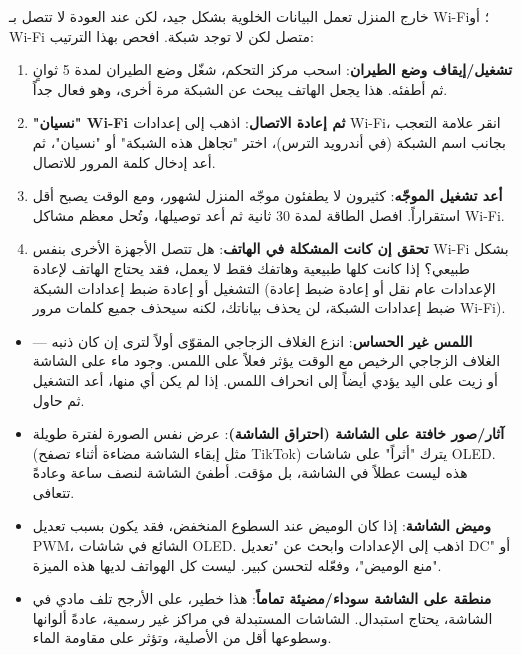 
خارج المنزل تعمل البيانات الخلوية بشكل جيد، لكن عند العودة لا تتصل بـ Wi-Fi؛ أو Wi-Fi متصل لكن لا توجد شبكة. افحص بهذا الترتيب:

\begin{enumerate}
  \item \textbf{تشغيل/إيقاف وضع الطيران}: اسحب مركز التحكم، شغّل وضع الطيران لمدة 5 ثوانٍ ثم أطفئه. هذا يجعل الهاتف يبحث عن الشبكة مرة أخرى، وهو فعال جداً.
  \item \textbf{"نسيان" Wi-Fi ثم إعادة الاتصال}: اذهب إلى إعدادات Wi-Fi، انقر علامة التعجب بجانب اسم الشبكة (في أندرويد الترس)، اختر "تجاهل هذه الشبكة" أو "نسيان"، ثم أعد إدخال كلمة المرور للاتصال.
  \item \textbf{أعد تشغيل الموجّه}: كثيرون لا يطفئون موجّه المنزل لشهور، ومع الوقت يصبح أقل استقراراً. افصل الطاقة لمدة 30 ثانية ثم أعد توصيلها، وتُحل معظم مشاكل Wi-Fi.
  \item \textbf{تحقق إن كانت المشكلة في الهاتف}: هل تتصل الأجهزة الأخرى بنفس Wi-Fi بشكل طبيعي؟ إذا كانت كلها طبيعية وهاتفك فقط لا يعمل، فقد يحتاج الهاتف لإعادة التشغيل أو إعادة ضبط إعدادات الشبكة (الإعدادات عام نقل أو إعادة ضبط إعادة ضبط إعدادات الشبكة، لن يحذف بياناتك، لكنه سيحذف جميع كلمات مرور Wi-Fi).
\end{enumerate}


\begin{itemize}
  \item \textbf{اللمس غير الحساس}: انزع الغلاف الزجاجي المقوّى أولاً لترى إن كان ذنبه — الغلاف الزجاجي الرخيص مع الوقت يؤثر فعلاً على اللمس. وجود ماء على الشاشة أو زيت على اليد يؤدي أيضاً إلى انحراف اللمس. إذا لم يكن أي منها، أعد التشغيل ثم حاول.
  \item \textbf{آثار/صور خافتة على الشاشة (احتراق الشاشة)}: عرض نفس الصورة لفترة طويلة (مثل إبقاء الشاشة مضاءة أثناء تصفح TikTok) يترك "أثراً" على شاشات OLED. هذه ليست عطلاً في الشاشة، بل مؤقت. أطفئ الشاشة لنصف ساعة وعادةً تتعافى.
  \item \textbf{وميض الشاشة}: إذا كان الوميض عند السطوع المنخفض، فقد يكون بسبب تعديل PWM، الشائع في شاشات OLED. اذهب إلى الإعدادات وابحث عن "تعديل DC" أو "منع الوميض"، وفعّله لتحسن كبير. ليست كل الهواتف لديها هذه الميزة.
  \item \textbf{منطقة على الشاشة سوداء/مضيئة تماماً}: هذا خطير، على الأرجح تلف مادي في الشاشة، يحتاج استبدال. الشاشات المستبدلة في مراكز غير رسمية، عادةً ألوانها وسطوعها أقل من الأصلية، وتؤثر على مقاومة الماء.
\end{itemize}

